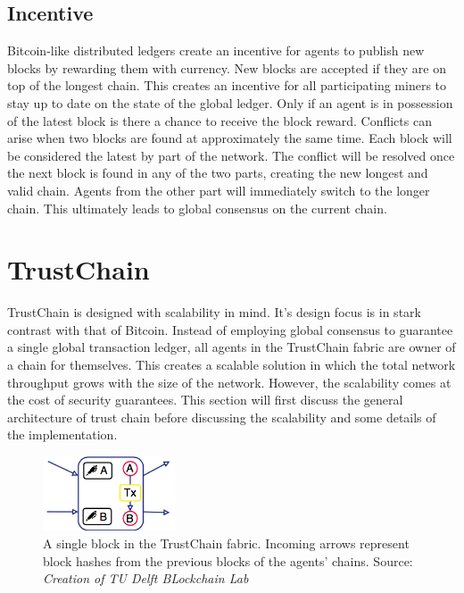 \subsection{Incentive}
Bitcoin-like distributed ledgers create an incentive for agents to publish new blocks by rewarding 
them with currency. New blocks are accepted if they are on top of the longest chain. This creates 
an incentive for all participating miners to stay up to date on the state of the global ledger. Only
if an agent is in possession of the latest block is there a chance to receive the block reward. 
Conflicts can arise when two blocks are found at approximately the same time. Each block will be 
considered the latest by part of the network. The conflict will be resolved once the next block is 
found in any of the two parts, creating the new longest and valid chain. Agents from the other part 
will immediately switch to the longer chain. This ultimately leads to global consensus on the 
current chain.

% 

\section{TrustChain}
\label{sec:trustchain}
TrustChain is designed with scalability in mind. It's design focus is in stark contrast with that of
Bitcoin. Instead of employing global consensus to guarantee a single global transaction ledger, 
all agents in the TrustChain fabric are owner of a chain for themselves. This creates a scalable 
solution in which the total network throughput grows with the size of the network. However, the
scalability comes at the cost of security guarantees. This section will first discuss the general 
architecture of trust chain before discussing the scalability and some details of the implementation.

\begin{figure}
    \centering
    \includegraphics[width=0.35\textwidth]{images/block}
    \caption{A single block in the TrustChain fabric. Incoming arrows represent block hashes from the previous blocks of the agents' chains. Source: \textit{Creation of TU Delft BLockchain Lab}}
    \label{fig:trustchain_block}
\end{figure}

